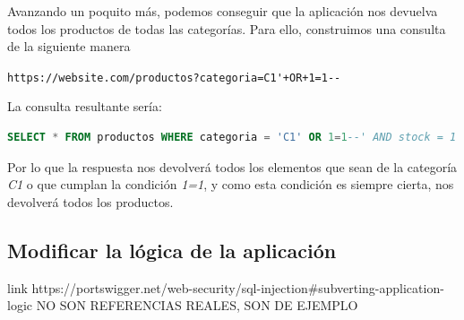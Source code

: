 \documentclass[bibliography=totocnumbered]{scrartcl}
\begin{document}
Avanzando un poquito más, podemos conseguir que la aplicación nos devuelva todos los productos de todas las categorías. Para ello, construimos una consulta de la siguiente manera
\begin{center}
\nolinkurl{https://website.com/productos?categoria=C1'+OR+1=1--}
\end{center}
La consulta resultante sería:
\begin{lstlisting}[language=SQL]
  SELECT * FROM productos WHERE categoria = 'C1' OR 1=1--' AND stock = 1
\end{lstlisting}
Por lo que la respuesta nos devolverá todos los elementos que sean de la categoría \textit{C1} o que cumplan la condición \textit{1=1}, y como esta condición es siempre cierta, nos devolverá todos los productos.\\

\subsection{Modificar la lógica de la aplicación}
link https://portswigger.net/web-security/sql-injection\#subverting-application-logic
\newpage
NO SON REFERENCIAS REALES, SON DE EJEMPLO
\nocite{*}


\end{document}
